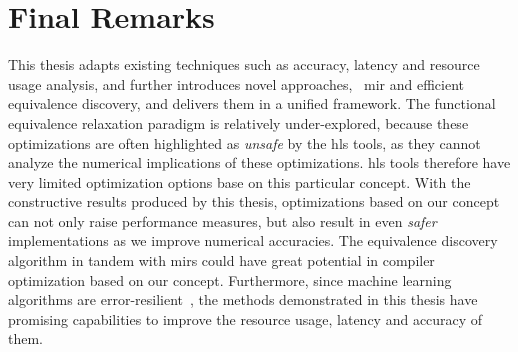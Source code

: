


\section{Final Remarks}
\label{cc:sec:final_remarks}

This thesis adapts existing techniques such as accuracy, latency and resource
usage analysis, and further introduces novel approaches, \eg~\gls{mir} and
efficient equivalence discovery, and delivers them in a unified framework.
The functional equivalence relaxation paradigm is relatively under-explored,
because these optimizations are often highlighted as \emph{unsafe} by the
\gls{hls} tools, as they cannot analyze the numerical implications of these
optimizations.  \Gls{hls} tools therefore have very limited optimization
options base on this particular concept.  With the constructive results
produced by this thesis, optimizations based on our concept can not only raise
performance measures, but also result in even \emph{safer} implementations
as we improve numerical accuracies.  The equivalence discovery algorithm in
tandem with \glspl{mir} could have great potential in compiler optimization
based on our concept.  Furthermore, since machine learning algorithms are
error-resilient~\cite{lesser11, kim09, holt91, zhu03}, the methods demonstrated
in this thesis have promising capabilities to improve the resource usage,
latency and accuracy of them.
